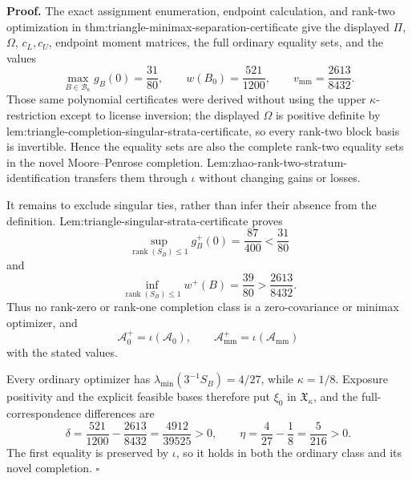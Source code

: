 \textbf{Proof.}
The exact assignment enumeration, endpoint calculation, and rank-two optimization in thm:triangle-minimax-separation-certificate give the displayed \(\Pi\), \(\Omega\), \(c_L,c_U\), endpoint moment matrices, the full ordinary equality sets, and the values
\[
 \max_{B\in\mathcal B_\kappa}g_B(0)=\frac{31}{80},
 \qquad w(B_0)=\frac{521}{1200},
 \qquad v_{\mathrm{mm}}=\frac{2613}{8432}.
\]
Those same polynomial certificates were derived without using the upper \(\kappa\)-restriction except to license inversion; the displayed \(\Omega\) is positive definite by lem:triangle-completion-singular-strata-certificate, so every rank-two block basis is invertible.  Hence the equality sets are also the complete rank-two equality sets in the novel Moore--Penrose completion.  Lem:zhao-rank-two-stratum-identification transfers them through \(\iota\) without changing gains or losses.

It remains to exclude singular ties, rather than infer their absence from the definition.  Lem:triangle-singular-strata-certificate proves
\[
 \sup_{\operatorname{rank}(S_B)\le1}g_B^+(0)=\frac{87}{400}<\frac{31}{80}
\]
and
\[
 \inf_{\operatorname{rank}(S_B)\le1}w^+(B)=\frac{39}{80}>\frac{2613}{8432}.
\]
Thus no rank-zero or rank-one completion class is a zero-covariance or minimax optimizer, and
\[
 \mathcal A_0^+=\iota(\mathcal A_0),
 \qquad \mathcal A_{\mathrm{mm}}^+=\iota(\mathcal A_{\mathrm{mm}})
\]
with the stated values.

Every ordinary optimizer has \(\lambda_{\min}(3^{-1}S_B)=4/27\), while \(\kappa=1/8\).  Exposure positivity and the explicit feasible bases therefore put \(\xi_0\) in \(\mathfrak X_\kappa\), and the full-correspondence differences are
\[
 \delta=\frac{521}{1200}-\frac{2613}{8432}=\frac{4912}{39525}>0,
 \qquad \eta=\frac4{27}-\frac18=\frac5{216}>0.
\]
The first equality is preserved by \(\iota\), so it holds in both the ordinary class and its novel completion. \(\square\)